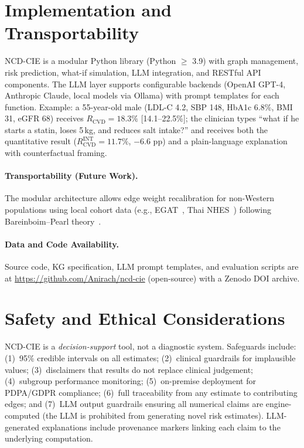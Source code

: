 \documentclass[runningheads]{llncs}
\begin{document}
\section{Implementation and Transportability}\label{sec:impl}

NCD-CIE is a modular Python library (Python $\geq$ 3.9) with
graph management, risk prediction, what-if simulation, LLM
integration, and RESTful API components.
The LLM layer supports configurable backends (OpenAI GPT-4,
Anthropic Claude, local models via Ollama) with prompt templates
for each function.
Example: a 55-year-old male (LDL-C 4.2, SBP 148, HbA1c 6.8\%, BMI
31, eGFR 68) receives $R_{\text{CVD}} = 18.3\%$ [14.1--22.5\%];
the clinician types ``what if he starts a statin, loses 5\,kg,
and reduces salt intake?'' and receives both the quantitative result
($R_{\text{CVD}}^{\text{INT}} = 11.7\%$, $-$6.6 pp) and a
plain-language explanation with counterfactual framing.

\paragraph{Transportability (Future Work).}
The modular architecture allows edge weight recalibration for
non-Western populations using local cohort data (e.g.,
EGAT~\cite{sritara2003egat}, Thai NHES~\cite{aekplakorn2011thai})
following Bareinboim--Pearl theory~\cite{bareinboim2016causal}.

\paragraph{Data and Code Availability.}
Source code, KG specification, LLM prompt templates, and evaluation
scripts are at
\url{https://github.com/Anirach/ncd-cie} (open-source) with a
Zenodo DOI archive.

\section{Safety and Ethical Considerations}\label{sec:ethics}

NCD-CIE is a \emph{decision-support} tool, not a diagnostic system.
Safeguards include: (1)~95\% credible intervals on all estimates;
(2)~clinical guardrails for implausible values;
(3)~disclaimers that results do not replace clinical judgement;
(4)~subgroup performance monitoring;
(5)~on-premise deployment for PDPA/GDPR compliance;
(6)~full traceability from any estimate to contributing edges; and
(7)~LLM output guardrails ensuring all numerical claims are
engine-computed (the LLM is prohibited from generating novel
risk estimates).
LLM-generated explanations include provenance markers linking
each claim to the underlying computation.
\end{document}

